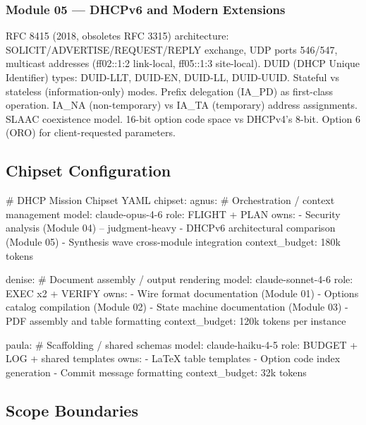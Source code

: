 \documentclass[11pt,letterpaper]{article}
\begin{document}
\subsubsection{Module 05 --- DHCPv6 and Modern Extensions}
RFC 8415 (2018, obsoletes RFC 3315) architecture: SOLICIT/ADVERTISE/REQUEST/REPLY exchange, UDP ports 546/547, multicast addresses (ff02::1:2 link-local, ff05::1:3 site-local). DUID (DHCP Unique Identifier) types: DUID-LLT, DUID-EN, DUID-LL, DUID-UUID. Stateful vs stateless (information-only) modes. Prefix delegation (IA\_PD) as first-class operation. IA\_NA (non-temporary) vs IA\_TA (temporary) address assignments. SLAAC coexistence model. 16-bit option code space vs DHCPv4's 8-bit. Option 6 (ORO) for client-requested parameters.

\subsection{Chipset Configuration}

\begin{asciibox}
# DHCP Mission Chipset YAML
chipset:
  agnus:  # Orchestration / context management
    model: claude-opus-4-6
    role: FLIGHT + PLAN
    owns:
      - Security analysis (Module 04) -- judgment-heavy
      - DHCPv6 architectural comparison (Module 05)
      - Synthesis wave cross-module integration
    context_budget: 180k tokens

  denise:  # Document assembly / output rendering
    model: claude-sonnet-4-6
    role: EXEC x2 + VERIFY
    owns:
      - Wire format documentation (Module 01)
      - Options catalog compilation (Module 02)
      - State machine documentation (Module 03)
      - PDF assembly and table formatting
    context_budget: 120k tokens per instance

  paula:   # Scaffolding / shared schemas
    model: claude-haiku-4-5
    role: BUDGET + LOG + shared templates
    owns:
      - LaTeX table templates
      - Option code index generation
      - Commit message formatting
    context_budget: 32k tokens
\end{asciibox}

\subsection{Scope Boundaries}
\end{document}
